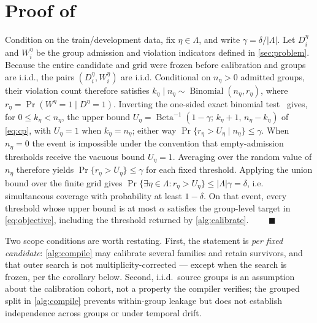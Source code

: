 \section{Proof of \texorpdfstring{}{Proposition 1}}
\label{app:proof}

Condition on the train/development data, fix $\eta\in\Lambda$, and write
$\gamma=\delta/|\Lambda|$. Let $D_i^\eta$ and $W_i^\eta$ be the group admission
and violation indicators defined in \cref{sec:problem}. Because the entire
candidate and grid were frozen before calibration and groups are i.i.d., the
pairs $(D_i^\eta,W_i^\eta)$ are i.i.d. Conditional on $n_\eta>0$ admitted
groups, their violation count therefore satisfies $k_\eta\mid
n_\eta\sim\operatorname{Binomial}(n_\eta,r_\eta)$, where $r_\eta=\Pr(W^\eta=1\mid
D^\eta=1)$. Inverting the one-sided exact binomial
test~\citep{clopper1934binomial} gives, for $0\le k_\eta<n_\eta$, the upper bound
$U_\eta=\operatorname{Beta}^{-1}(1-\gamma;\,k_\eta+1,\,n_\eta-k_\eta)$ of
\cref{eq:cp}, with $U_\eta=1$ when $k_\eta=n_\eta$; either way
$\Pr\{r_\eta > U_\eta \mid n_\eta\}\le\gamma$. When $n_\eta=0$ the event is
impossible under the convention that empty-admission thresholds receive the
vacuous bound $U_\eta=1$. Averaging over the random value
of $n_\eta$ therefore yields $\Pr\{r_\eta > U_\eta\}\le\gamma$ for each fixed
threshold. Applying the union bound over the finite grid gives
$\Pr\{\exists\eta\in\Lambda: r_\eta > U_\eta\}\le|\Lambda|\gamma=\delta$, i.e.
simultaneous coverage with probability at least $1-\delta$. On that event, every
threshold whose upper bound is at most $\alpha$ satisfies the group-level target
in \cref{eq:objective}, including the threshold returned by
\cref{alg:calibrate}. $\qquad\blacksquare$

Two scope conditions are worth restating. First, the statement is \emph{per
fixed candidate}: \cref{alg:compile} may calibrate several families and retain
survivors, and that outer search is not multiplicity-corrected --- except when
the search is frozen, per the corollary below. Second, i.i.d.\ source groups is
an assumption about the calibration cohort, not a property the compiler
verifies; the grouped split in \cref{alg:compile} prevents within-group leakage
but does not establish independence across groups or under temporal drift.

